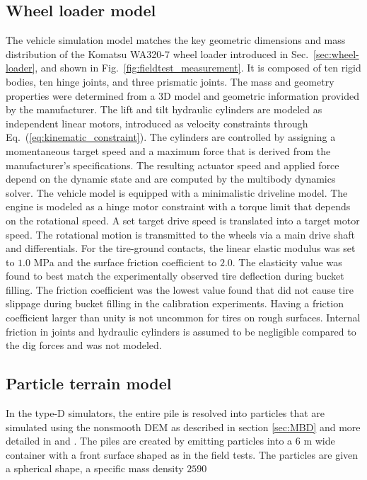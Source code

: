 \documentclass[10pt]{article}
\begin{document}
\subsection{Wheel loader model}
\label{sec:wheel-loader-model}
The vehicle simulation model matches the key geometric dimensions and mass distribution of 
the Komatsu WA320-7 wheel loader introduced in Sec.~\ref{sec:wheel-loader}, and shown in Fig.~\ref{fig:fieldtest_measurement}. It is composed
of ten rigid bodies, ten hinge joints, and three prismatic joints. The mass and geometry properties were determined from a 3D model and geometric information provided by the manufacturer. The lift and tilt
hydraulic cylinders are modeled as independent linear motors, introduced as velocity constraints through Eq.~(\ref{eq:kinematic_constraint}).
The cylinders are controlled by assigning a momentaneous target speed and a maximum force that is derived 
from the manufacturer's specifications. The resulting actuator speed and applied force depend on the dynamic 
state and are computed by the multibody dynamics solver. 
The vehicle model is equipped with a minimalistic driveline model. The engine is
modeled as a hinge motor constraint with a torque limit that depends on the 
rotational speed. A set target drive speed is translated into a target motor speed. 
The rotational motion is transmitted to the wheels via a main drive shaft and differentials.
For the tire-ground contacts, the linear elastic modulus was set to $1.0$ MPa and the surface friction coefficient to $2.0$. The elasticity value was found to best match the experimentally observed tire deflection during bucket filling. The friction coefficient was the lowest value found that did not cause tire slippage during bucket filling in the calibration experiments. Having a friction coefficient larger than unity is not uncommon for tires on rough surfaces. Internal friction in joints and hydraulic cylinders is assumed to be negligible compared to the dig forces and was not modeled.
																				

\subsection{Particle terrain model}
\label{sec:particle_terrain}
In the type-D simulators, the entire pile is resolved into particles that are 
simulated using the nonsmooth DEM as described in section \ref{sec:MBD} and more detailed in \cite{servin:2014:esn} and \cite{wiberg:2021:dem}.
The piles are created by emitting particles into a 6 m wide container with a front surface
shaped as in the field tests. The particles are given a spherical shape, a specific mass density $2590$ 
																							  
\end{document}
